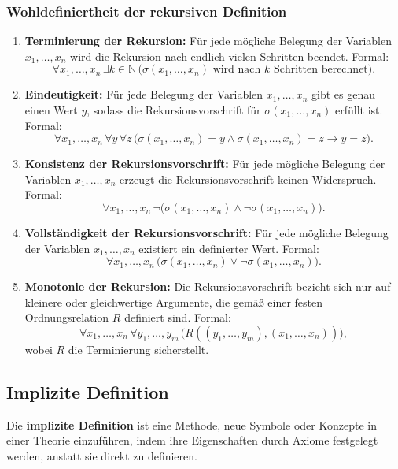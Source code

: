\documentclass[main.tex]{subfiles}
\begin{document}
\begin{definition}
\subsubsection{Wohldefiniertheit der rekursiven Definition}
\begin{enumerate}
    \item \textbf{Terminierung der Rekursion:} Für jede mögliche Belegung der Variablen \(x_1, \ldots, x_n\) wird die Rekursion nach endlich vielen Schritten beendet. Formal:
    \[
    \forall x_1, \ldots, x_n \, \exists k \in \mathbb{N} \, \bigl( \text{\(\sigma(x_1, \ldots, x_n)\) wird nach \(k\) Schritten berechnet} \bigr).
    \]
    \item \textbf{Eindeutigkeit:} Für jede Belegung der Variablen \(x_1, \ldots, x_n\) gibt es genau einen Wert \(y\), sodass die Rekursionsvorschrift für \(\sigma(x_1, \ldots, x_n)\) erfüllt ist. Formal:
    \[
    \forall x_1, \ldots, x_n \, \forall y \, \forall z \, \bigl( \sigma(x_1, \ldots, x_n) = y \land \sigma(x_1, \ldots, x_n) = z \rightarrow y = z \bigr).
    \]
    \item \textbf{Konsistenz der Rekursionsvorschrift:} Für jede mögliche Belegung der Variablen \(x_1, \ldots, x_n\) erzeugt die Rekursionsvorschrift keinen Widerspruch. Formal:
    \[
    \forall x_1, \ldots, x_n \, \neg \bigl( \sigma(x_1, \ldots, x_n) \land \neg \sigma(x_1, \ldots, x_n) \bigr).
    \]
    \item \textbf{Vollständigkeit der Rekursionsvorschrift:} Für jede mögliche Belegung der Variablen \(x_1, \ldots, x_n\) existiert ein definierter Wert. Formal:
    \[
    \forall x_1, \ldots, x_n \, \bigl( \sigma(x_1, \ldots, x_n) \lor \neg \sigma(x_1, \ldots, x_n) \bigr).
    \]
    \item \textbf{Monotonie der Rekursion:} Die Rekursionsvorschrift bezieht sich nur auf kleinere oder gleichwertige Argumente, die gemäß einer festen Ordnungsrelation \(R\) definiert sind. Formal:
    \[
    \forall x_1, \ldots, x_n \, \forall y_1, \ldots, y_m \, \bigl( R((y_1, \ldots, y_m), (x_1, \ldots, x_n)) \bigr),
    \]
    wobei \(R\) die Terminierung sicherstellt.
\end{enumerate}
\end{definition}


\subsection{Implizite Definition}

Die \textbf{implizite Definition} ist eine Methode, neue Symbole oder Konzepte in einer Theorie einzuführen, indem ihre Eigenschaften durch Axiome festgelegt werden, anstatt sie direkt zu definieren.
\end{document}
